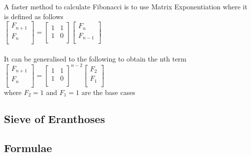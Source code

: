 \noindent
A faster method to calculate Fibonacci is to use Matrix Exponentiation where it is defined as follows \\
\noindent
$
\begin{bmatrix}
F_{n + 1} \\
F_{n} \\
\end{bmatrix} =
\begin{bmatrix}
1 & 1 \\
1 & 0 \\
\end{bmatrix}
\begin{bmatrix}
F_{n} \\
F_{n - 1} \\
\end{bmatrix}
$ \\ \\

\noindent
It can be generalised to the following to obtain the nth term \\
$
\begin{bmatrix}
F_{n + 1} \\
F_{n} \\
\end{bmatrix} =
\begin{bmatrix}
1 & 1 \\
1 & 0 \\
\end{bmatrix}^{n - 2}
\begin{bmatrix}
F_{2} \\
F_{1} \\
\end{bmatrix}
$ \\
where $F_{2} = 1$ and $F_{1} = 1$ are the base cases

\subsection{Sieve of Eranthoses}

\subsection{Formulae}
